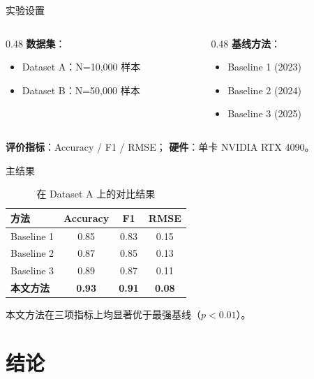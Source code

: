 \documentclass[aspectratio=169,11pt]{beamer}
\begin{document}
\begin{frame}{实验设置}
  \begin{columns}[T,onlytextwidth]
    \begin{column}{0.48\textwidth}
      \textbf{数据集}：
      \begin{itemize}
        \item Dataset A：N=10,000 样本
        \item Dataset B：N=50,000 样本
      \end{itemize}
    \end{column}
    \begin{column}{0.48\textwidth}
      \textbf{基线方法}：
      \begin{itemize}
        \item Baseline 1 (2023)
        \item Baseline 2 (2024)
        \item Baseline 3 (2025)
      \end{itemize}
    \end{column}
  \end{columns}
  \vspace{0.5em}
  \textbf{评价指标}：Accuracy / F1 / RMSE；
  \textbf{硬件}：单卡 NVIDIA RTX 4090。
\end{frame}

\begin{frame}{主结果}
  \begin{table}
    \centering
    \small
    \begin{tabular}{lccc}
      \toprule
      方法 & Accuracy & F1 & RMSE \\
      \midrule
      Baseline 1 & 0.85 & 0.83 & 0.15 \\
      Baseline 2 & 0.87 & 0.85 & 0.13 \\
      Baseline 3 & 0.89 & 0.87 & 0.11 \\
      \textbf{本文方法} & \textbf{0.93} & \textbf{0.91} & \textbf{0.08} \\
      \bottomrule
    \end{tabular}
    \caption{在 Dataset A 上的对比结果}
  \end{table}
  \vspace{0.3em}
  \alert{本文方法}在三项指标上均显著优于最强基线（$p < 0.01$）。
\end{frame}

\section{结论}
\end{document}
